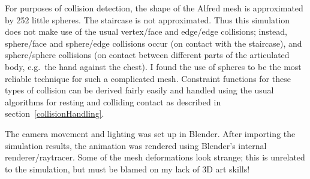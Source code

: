 For purposes of collision detection, the shape of the Alfred mesh is approximated by 252 little
spheres. The staircase is not approximated. Thus this simulation does not make use of the usual
vertex/face and edge/edge collisions; instead, sphere/face and sphere/edge collisions occur
(on contact with the staircase), and sphere/sphere collisions (on contact between different parts
of the articulated body, e.g.\ the hand against the chest). I found the use of spheres to be the
most reliable technique for such a complicated mesh. Constraint functions for these types of
collision can be derived fairly easily and handled using the usual algorithms for resting and
colliding contact as described in section~\ref{collisionHandling}.

The camera movement and lighting was set up in Blender. After importing the simulation results,
the animation was rendered using Blender's internal renderer/raytracer. Some of the mesh
deformations look strange; this is unrelated to the simulation, but must be blamed on my lack of
3D art skills!

